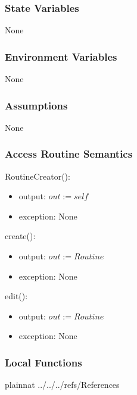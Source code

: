 \documentclass[12pt, titlepage]{article}
\begin{document}
\subsubsection{State Variables}
None
\subsubsection{Environment Variables}
None
\subsubsection{Assumptions}
None
\subsubsection{Access Routine Semantics}

\noindent RoutineCreator():
\begin{itemize}
	\item output: $out := self$
	\item exception: None
\end{itemize}

\noindent create():
\begin{itemize}
	\item output: $out := Routine$
	\item exception: None
\end{itemize}

\noindent edit():
\begin{itemize}
	\item output: $out := Routine$
	\item exception: None
\end{itemize}

\subsubsection{Local Functions}

\newpage

 {plainnat}
 {../../../refs/References}
\end{document}
